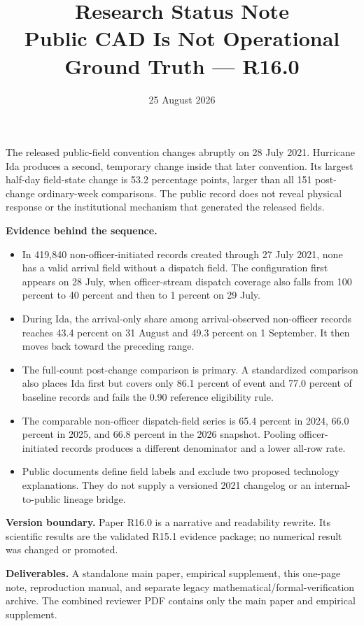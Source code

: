 \documentclass[10pt]{article}
\title{\vspace{-2.2em}\textbf{Research Status Note}\\[0.25em]
\large Public CAD Is Not Operational Ground Truth --- R16.0}
\author{}
\date{25 August 2026}
\begin{document}
\maketitle
\thispagestyle{plain}
\vspace{-1.9em}

\begin{plainbox}[title=Four findings to retain]
The released public-field convention changes abruptly on 28 July 2021. Hurricane Ida produces a second, temporary change inside that later convention. Its largest half-day field-state change is 53.2 percentage points, larger than all 151 post-change ordinary-week comparisons. The public record does not reveal physical response or the institutional mechanism that generated the released fields.
\end{plainbox}

\noindent\textbf{Evidence behind the sequence.}
\begin{itemize}
\item In 419,840 non-officer-initiated records created through 27 July 2021, none has a valid arrival field without a dispatch field. The configuration first appears on 28 July, when officer-stream dispatch coverage also falls from 100 percent to 40 percent and then to 1 percent on 29 July.
\item During Ida, the arrival-only share among arrival-observed non-officer records reaches 43.4 percent on 31 August and 49.3 percent on 1 September. It then moves back toward the preceding range.
\item The full-count post-change comparison is primary. A standardized comparison also places Ida first but covers only 86.1 percent of event and 77.0 percent of baseline records and fails the 0.90 reference eligibility rule.
\item The comparable non-officer dispatch-field series is 65.4 percent in 2024, 66.0 percent in 2025, and 66.8 percent in the 2026 snapshot. Pooling officer-initiated records produces a different denominator and a lower all-row rate.
\item Public documents define field labels and exclude two proposed technology explanations. They do not supply a versioned 2021 changelog or an internal-to-public lineage bridge.
\end{itemize}

\noindent\textbf{Version boundary.} Paper R16.0 is a narrative and readability rewrite. Its scientific results are the validated R15.1 evidence package; no numerical result was changed or promoted.

\noindent\textbf{Deliverables.} A standalone main paper, empirical supplement, this one-page note, reproduction manual, and separate legacy mathematical/formal-verification archive. The combined reviewer PDF contains only the main paper and empirical supplement.
\end{document}
